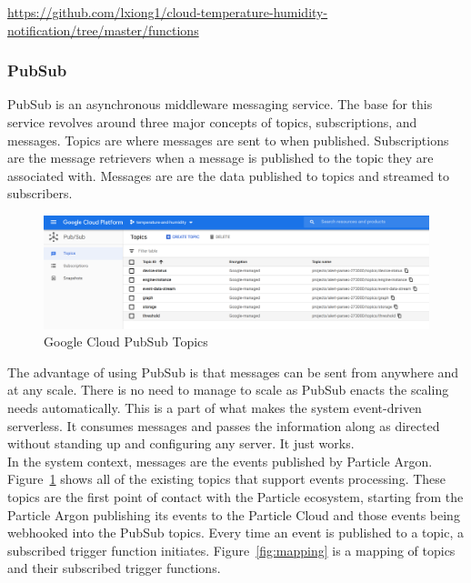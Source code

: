 \documentclass{article}
\begin{document}
\url{https://github.com/lxiong1/cloud-temperature-humidity-notification/tree/master/functions}

\subsubsection{PubSub}
\label{section:pubsub}
PubSub is an asynchronous middleware messaging service. The base for this service revolves around three major concepts of topics, subscriptions, and messages. Topics are where messages are sent to when published. Subscriptions are the message retrievers when a message is published to the topic they are associated with. Messages are are the data published to topics and streamed to subscribers.

\begin{figure}[H]
	\center
	\includegraphics[width=\textwidth]{images/pubsub-topics.png}
	\caption{Google Cloud PubSub Topics}
	\label{fig:pubsub-topics}
\end{figure}

The advantage of using PubSub is that messages can be sent from anywhere and at any scale. There is no need to manage to scale as PubSub enacts the scaling needs automatically. This is a part of what makes the system event-driven serverless. It consumes messages and passes the information along as directed without standing up and configuring any server. It just works.\\

In the system context, messages are the events published by Particle Argon. Figure~\ref{fig:pubsub-topics} shows all of the existing topics that support events processing. These topics are the first point of contact with the Particle ecosystem, starting from the Particle Argon publishing its events to the Particle Cloud and those events being webhooked into the PubSub topics. Every time an event is published to a topic, a subscribed trigger function initiates. Figure~\ref{fig:mapping} is a mapping of topics and their subscribed trigger functions.\\
\end{document}
